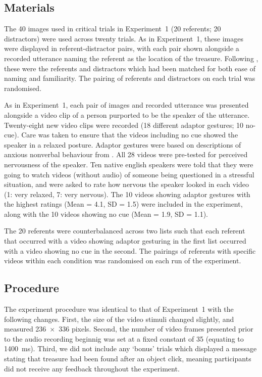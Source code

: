 \documentclass[a4paper,man,natbib]{apa6}
\begin{document}
\subsection{Materials}
The 40 images used in critical trials in Experiment~1 (20 referents; 20 distractors) were used across twenty trials.
As in Experiment~1, these images were displayed in referent-distractor pairs, with each pair shown alongside a recorded utterance naming the referent as the location of the treasure.
Following \citet{Loy2017}, these were the referents and distractors which had been matched for both ease of naming and familiarity.
The pairing of referents and distractors on each trial was randomised.

As in Experiment~1, each pair of images and recorded utterance was presented alongside a video clip of a person purported to be the speaker of the utterance.
Twenty-eight new video clips were recorded (18 different adaptor gestures; 10 no-cue). 
Care was taken to ensure that the videos including no cue showed the speaker in a relaxed posture. 
Adaptor gestures were based on descriptions of anxious nonverbal behaviour from \citet{Gregersen2005}.
All 28 videos were pre-tested for perceived nervousness of the speaker.
Ten native english speakers were told that they were going to watch videos (without audio) of someone being questioned in a stressful situation, and were asked to rate how nervous the speaker looked in each video (1: very relaxed, 7: very nervous). 
The 10 videos showing adaptor gestures with the highest ratings (Mean = 4.1, SD = 1.5) were included in the experiment, along with the 10 videos showing no cue (Mean = 1.9, SD = 1.1).

The 20 referents were counterbalanced across two lists such that each referent that occurred with a video showing adaptor gesturing in the first list occurred with a video showing no cue in the second.
The pairings of referents with specific videos within each condition was randomised on each run of the experiment.

\subsection{Procedure}
The experiment procedure was identical to that of Experiment~1 with the following changes.
First, the size of the video stimuli changed slightly, and measured 236~$\times$~336 pixels.
Second, the number of video frames presented prior to the audio recording beginnig was set at a fixed constant of 35 (equating to 1400~ms).
Third, we did not include any `bonus' trials which displayed a message stating that treasure had been found after an object click, meaning participants did not receive any feedback throughout the experiment.
\end{document}
